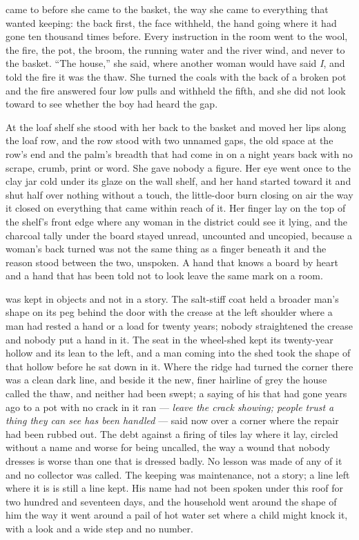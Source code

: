 \scenebreak

 came to  before she came to the basket, the way she came to everything that wanted keeping: the back first, the face withheld, the hand going where it had gone ten thousand times before. Every instruction in the room went to the wool, the fire, the pot, the broom, the running water and the river wind, and never to the basket. “The house,” she said, where another woman would have said \emph{I}, and told the fire it was the thaw. She turned the coals with the back of a broken pot and the fire answered four low pulls and withheld the fifth, and she did not look toward  to see whether the boy had heard the gap.

At the loaf shelf she stood with her back to the basket and moved her lips along the loaf row, and the row stood with two unnamed gaps, the old space at the row's end and the palm's breadth that had come in on a night years back with no scrape, crumb, print or word. She gave nobody a figure. Her eye went once to the clay jar cold under its glaze on the wall shelf, and her hand started toward it and shut half over nothing without a touch, the little-door burn closing on air the way it closed on everything that came within reach of it. Her finger lay on the top of the shelf's front edge where any woman in the district could see it lying, and the charcoal tally under the board stayed unread, uncounted and uncopied, because a woman's back turned was not the same thing as a finger beneath it and the reason stood between the two, unspoken. A hand that knows a board by heart and a hand that has been told not to look leave the same mark on a room.

 was kept in objects and not in a story. The salt-stiff coat held a broader man's shape on its peg behind the door with the crease at the left shoulder where a man had rested a hand or a load for twenty years; nobody straightened the crease and nobody put a hand in it. The seat in the wheel-shed kept its twenty-year hollow and its lean to the left, and a man coming into the shed took the shape of that hollow before he sat down in it. Where the  ridge had turned the corner there was a clean dark line, and beside it the new, finer hairline of grey the house called the thaw, and neither had been swept; a saying of his that had gone years ago to a pot with no crack in it ran --- \emph{leave the crack showing; people trust a thing they can see has been handled} --- said now over a corner where the repair had been rubbed out. The debt against a firing of tiles lay where it lay, circled without a name and worse for being uncalled, the way a wound that nobody dresses is worse than one that is dressed badly. No lesson was made of any of it and no collector was called. The keeping was maintenance, not a story; a line left where it is is still a line kept. His name had not been spoken under this roof for two hundred and seventeen days, and the household went around the shape of him the way it went around a pail of hot water set where a child might knock it, with a look and a wide step and no number.

